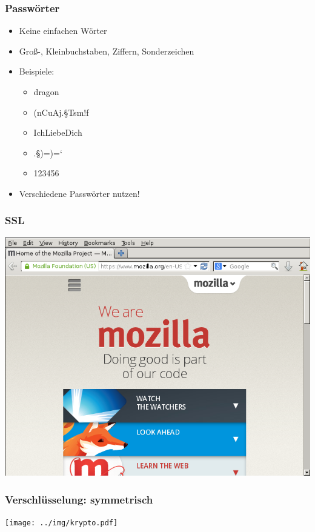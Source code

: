\documentclass[12pt, table]{beamer}
\begin{document}
\begin{frame}
    \frametitle{Passwörter}
    \begin{itemize}
        \item Keine einfachen Wörter
        \item Groß-, Kleinbuchstaben, Ziffern, Sonderzeichen
        \item Beispiele:
            \begin{itemize}
                \item dragon
                \item (nCuAj.§Tsm!f
                \item IchLiebeDich
                \item .§)=)=`
                \item 123456
            \end{itemize}
        \item<2> Verschiedene Passwörter nutzen!
    \end{itemize}
\end{frame}

\begin{frame}
  \frametitle{SSL}
  \begin{center}
      \includegraphics[height=0.7\textheight]{../img/ssl_special.png}
  \end{center}
\end{frame}

\begin{frame}
    \frametitle{Verschlüsselung: symmetrisch}
    \begin{center}
	\texttt{[image: ../img/krypto.pdf]}
    \end{center}	
\end{frame}
\end{document}
